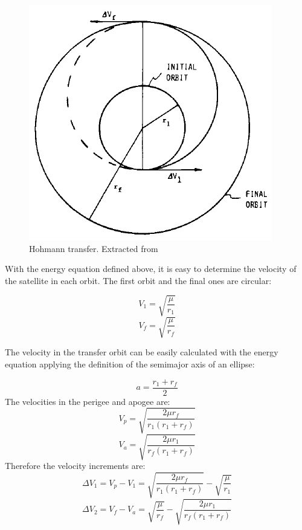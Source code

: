 \begin{figure}
\centerline{\includegraphics[scale=0.7]{Hohmann.png}}
\caption[Hohmann transfer]{Hohmann transfer. Extracted from \cite{Chobotov2002}}
\end{figure}

With the energy equation defined above, it is easy to determine the velocity of the satellite in each orbit. The first orbit and the final ones are circular:

\begin{equation}
V_{1}=\sqrt{\frac{\mu}{r_{1}}}
\end{equation}
\begin{equation}
V_{f}=\sqrt{\frac{\mu}{r_{f}}}
\end{equation}

The velocity in the transfer orbit can be easily calculated with the energy equation applying the definition of the semimajor axis of an ellipse:

\begin{equation}
a=\frac{r_{1}+r_{f}}{2}
\end{equation}
The velocities in the perigee and apogee are:
\begin{equation}
V_{p}=\sqrt{\frac{2\mu r_{f}}{r_{1}(r_{1}+r_{f})}}
\end{equation}
\begin{equation}
V_{a}=\sqrt{\frac{2\mu r_{1}}{r_{f}(r_{1}+r_{f})}}
\end{equation}
Therefore the velocity increments are:
\begin{equation}
\Delta V_{1}=V_{p}-V_{1}=\sqrt{\frac{2\mu r_{f}}{r_{1}(r_{1}+r_{f})}}-\sqrt{\frac{\mu}{r_{1}}}
\end{equation}
\begin{equation}
\Delta V_{2}=V_{f}-V_{a}=\sqrt{\frac{\mu}{r_{f}}}-\sqrt{\frac{2\mu r_{1}}{r_{f}(r_{1}+r_{f})}}
\end{equation}

